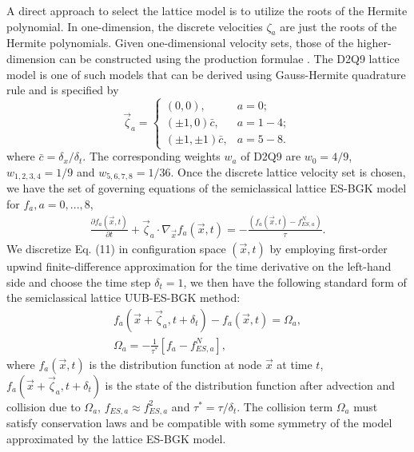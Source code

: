 \documentclass[aip,jmp,amsmath,amssymb,reprint,noshowpacs]{revtex4-1}
\begin{document}
A direct approach to select the lattice model is to utilize the roots of the Hermite polynomial. In one-dimension, the discrete velocities $\zeta_a$ are just the roots of the Hermite polynomials.  Given one-dimensional velocity sets, those of the higher-dimension can be constructed using the production formulae \cite{Shan2006}.  The D2Q9 lattice model is one of such models that can be derived using Gauss-Hermite quadrature rule and is specified by
\begin{equation}
\vec \zeta_a =
  \begin{cases}
   (0, 0), & a =0; \\
   (\pm 1, 0) \bar{c}, &  a=1-4; \\
   (\pm 1, \pm 1) \bar{c}, & a=5-8.
  \end{cases}
\end{equation}
where $\bar{c} = \delta_x/\delta_t$. The corresponding weights $w_a$ of D2Q9 are $w_0=4/9$, $w_{1,2,3,4}=1/9$ and $w_{5,6,7,8}=1/36$.
Once the discrete lattice velocity set is chosen, we have the set of governing equations of the semiclassical lattice ES-BGK model for $f_a, a=0, ..., 8$,
\begin{align}
\frac{\partial f_a (\vec x, t)}{\partial t} + \vec \zeta_a \cdot
\nabla_{\vec x} f_a( \vec x, t) =  -\frac{(f_a(\vec x, t) - f^{N}_{ES,a})}{\tau}.
\end{align}
We discretize Eq. (11) in configuration space $(\vec x,t)$ by employing first-order upwind finite-difference approximation for
the time derivative on the left-hand side and choose the time step $\delta_t = 1$, we then have the following standard form of the
semiclassical lattice UUB-ES-BGK method:
\begin{align}
f_a(\vec x+ \vec \zeta_a, t+\delta_t)- f_a(\vec x,t)=\Omega_a,\nonumber \\
\Omega_a = -\frac{1}{\tau^*}[f_a - f^{N}_{ES,a}],
\end{align}
where $f_a(\vec x,t)$ is the distribution function at node $\vec x$ at time $t$, $f_a(\vec x+ \vec \zeta_a, t+\delta_t)$ is the state of the distribution function after advection and collision due to $\Omega_a$, $f_{ES,a} \approx f_{ES,a}^{2}$ and $\tau^*= \tau/\delta_t$.  The collision term $\Omega_a$ must satisfy conservation laws and be compatible with some symmetry of the model approximated by the lattice ES-BGK model.
\end{document}
